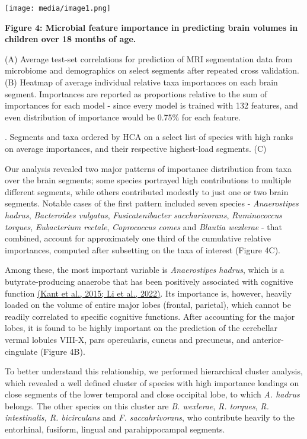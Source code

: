\documentclass[
]{article}
\begin{document}
\texttt{[image: media/image1.png]}

\textbf{Figure 4: Microbial feature importance in predicting brain
volumes in children over 18 months of age.}

(A) Average test-set correlations for prediction of MRI segmentation
data from microbiome and demographics on select segments after repeated
cross validation. (B) Heatmap of average individual relative taxa
importances on each brain segment. Importances are reported as
proportions relative to the sum of importances for each model - since
every model is trained with 132 features, and even distribution of
importance would be 0.75\% for each feature.

. Segments and taxa ordered by HCA on a select list of species with high
ranks on average importances, and their respective highest-load
segments. (C)

Our analysis revealed two major patterns of importance distribution from
taxa over the brain segments; some species portrayed high contributions
to multiple different segments, while others contributed modestly to
just one or two brain segments. Notable cases of the first pattern
included seven species - \emph{Anaerostipes hadrus}, \emph{Bacteroides
vulgatus}, \emph{Fusicatenibacter saccharivorans}, \emph{Ruminococcus
torques}, \emph{Eubacterium rectale}, \emph{Coprococcus comes} and
\emph{Blautia wexlerae} - that combined, account for approximately one
third of the cumulative relative importances, computed after subsetting
on the taxa of interest (Figure 4C).

Among these, the most important variable is \emph{Anaerostipes hadrus},
which is a butyrate-producing anaerobe that has been positively
associated with cognitive function
\href{https://www.zotero.org/google-docs/?AVJiwu}{(Kant et al., 2015; Li
et al., 2022)}. Its importance is, however, heavily loaded on the volume
of entire major lobes (frontal, parietal), which cannot be readily
correlated to specific cognitive functions. After accounting for the
major lobes, it is found to be highly important on the prediction of the
cerebellar vermal lobules VIII-X, pars opercularis, cuneus and
precuneus, and anterior-cingulate (Figure 4B).

To better understand this relationship, we performed hierarchical
cluster analysis, which revealed a well defined cluster of species with
high importance loadings on close segments of the lower temporal and
close occipital lobe, to which \emph{A. hadrus} belongs. The other
species on this cluster are \emph{B. wexlerae}, \emph{R. torques},
\emph{R. intestinalis, R. bicirculans} and \emph{F. saccahrivorans}, who
contribute heavily to the entorhinal, fusiform, lingual and
parahippocampal segments.
\end{document}
